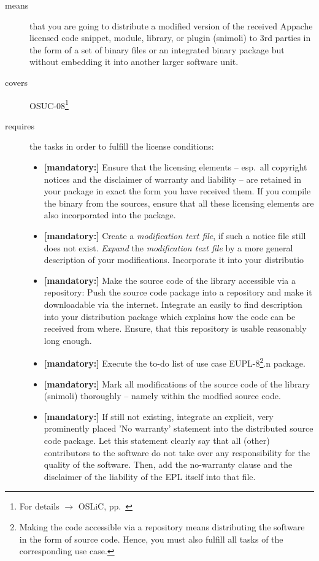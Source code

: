 \begin{description}
\item[means] that you are going to distribute a modified version of the received
Appache licensed code snippet, module, library, or plugin (snimoli) to 3rd
parties in the form of a set of binary files or an integrated binary package but
without embedding it into another larger software unit.
\item[covers] OSUC-08\footnote{For details $\rightarrow$ OSLiC, pp.\ \pageref{OSUC-08-DEF}}
\item[requires] the tasks in order to fulfill the license conditions:
\begin{itemize}

  \item \textbf{[mandatory:]} Ensure that the licensing elements -- esp.\ all
  copyright notices and the disclaimer of warranty and liability -- are retained
  in your package in exact the form you have received them. If you compile the
  binary from the sources, ensure that all these licensing elements are also
  incorporated into the package.

  \item \textbf{[mandatory:]} Create a \emph{modification text file}, if such a
  notice file still does not exist. \emph{Expand} the \emph{modification text
  file} by a more general description of your modifications. Incorporate it into
  your distributio  \item \textbf{[mandatory:]} Make the source code of the library accessible via
  a repository: Push the source code package into a repository and make it
  downloadable via the internet. Integrate an easily to find description into
  your distribution package which explains how the code can be received from
  where. Ensure, that this repository is usable reasonably long enough.
  
  \item \textbf{[mandatory:]} Execute the to-do list of use case EUPL-8\footnote{
  Making the code accessible via a repository means distributing the software in
  the form of source code. Hence, you must also fulfill all tasks of the
  corresponding use case.}.n package.

  \item \textbf{[mandatory:]} Mark all modifications of the source code of the
  library (snimoli) thoroughly -- namely within the modfied source code.

  \item \textbf{[mandatory:]} If still not existing, integrate an explicit, very
  prominently placed 'No warranty' statement into the distributed source code
  package. Let this statement clearly say that all (other) contributors to the
  software do not take over any responsibility for the quality of the software.
  Then, add the no-warranty clause and the disclaimer of the liability of the
  EPL itself into that file.
  

\end{itemize}
\end{description}

